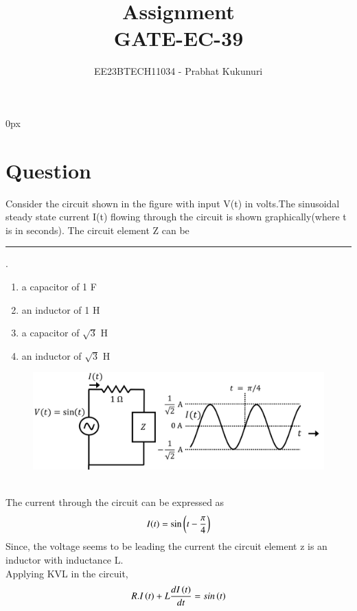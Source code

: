 \documentclass[journal,12pt,twocolumn]{IEEEtran}
\theoremstyle{remark}
\begin{document}
\parindent 0px


\vspace{3cm}

\title{Assignment\\[1ex]GATE-EC-39}
\author{EE23BTECH11034 - Prabhat Kukunuri$^{}$%
}
\maketitle
\newpage
\bigskip

\renewcommand{\thefigure}{\theenumi}
\renewcommand{\thetable}{\theenumi}
\section{Question}
Consider the circuit shown in the figure with input V(t) in volts.The sinusoidal steady state current I(t) flowing through the circuit is shown graphically(where t is in seconds). The circuit element Z can be\rule{1.5cm}{0.15mm}.
\begin{enumerate}
    \item a capacitor of 1 F
    \item an inductor of 1 H
    \item a capacitor of $\sqrt{3}$ H
    \item an inductor of $\sqrt{3}$ H
\end{enumerate}
\begin{figure}[ht]
    \centering
    \includegraphics[width=\columnwidth]{figs/Figure_1.png}
    \label{fig:GATE.2022.EC.39.1}
\end{figure}
\solution\\
The current through the circuit can be expressed as
\begin{align}
    I(t)=\sin\left(t-\frac{\pi}{4}\right)
\end{align}
Since, the voltage seems to be leading the current the circuit element z is an inductor with inductance L.\\
Applying KVL in the circuit,
\begin{align}
    R.I\left(t\right)+L\frac{dI\left(t\right)}{dt}=sin\left(t\right)
\end{align}
\end{document}
